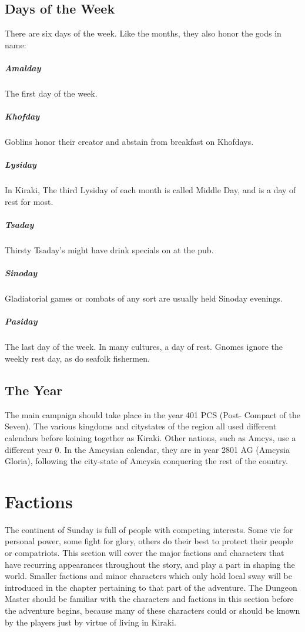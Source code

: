 \subsection{Days of the Week}
There are six days of the week. Like the months, they also honor the gods in name:
\subparagraph{Amalday} The first day of the week. 
\subparagraph{Khofday} Goblins honor their creator and abstain from breakfast on Khofdays.
\subparagraph{Lysiday} In Kiraki, The third Lysiday of each month is called Middle Day, and is a day of rest for most.
\subparagraph{Tsaday} Thirsty Tsaday's might have drink specials on at the pub.
\subparagraph{Sinoday} Gladiatorial games or combats of any sort are usually held Sinoday evenings.
\subparagraph{Pasiday} The last day of the week. In many cultures, a day of rest. Gnomes ignore the weekly rest day, as do seafolk fishermen.
\subsection{The Year}\label{Year} The main campaign should take place in the year 401 PCS (Post- Compact of the Seven). The various kingdoms and citystates of the region all used different calendars before koining together as Kiraki. Other nations, such as Amcys, use a different year 0. In the Amcysian calendar, they are in year 2801 AG (Amcysia Gloria), following the city-state of Amcysia conquering the rest of the country.

\section{Factions}
The continent of Sunday is full of people with competing interests. Some vie for personal power, some fight for glory, others do their best to protect their people or compatriots. This section will cover the major factions and characters that have recurring appearances throughout the story, and play a part in shaping the world. Smaller factions and minor characters which only hold local sway will be introduced in the chapter pertaining to that part of the adventure. The Dungeon Master should be familiar with the characters and factions in this section before the adventure begins, because many of these characters could or should be known by the players just by virtue of living in Kiraki.
